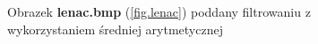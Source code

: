 \documentclass{classrep}
\begin{document}
\begin{figure}
{{  \label{fig.lenac_average_5x5}
 }
}
\caption{Obrazek \textbf{lenac.bmp} (\ref{fig.lenac}) poddany filtrowaniu z wykorzystaniem średniej arytmetycznej}
\label{fig.lenac_average}
\end{figure}
\end{document}
